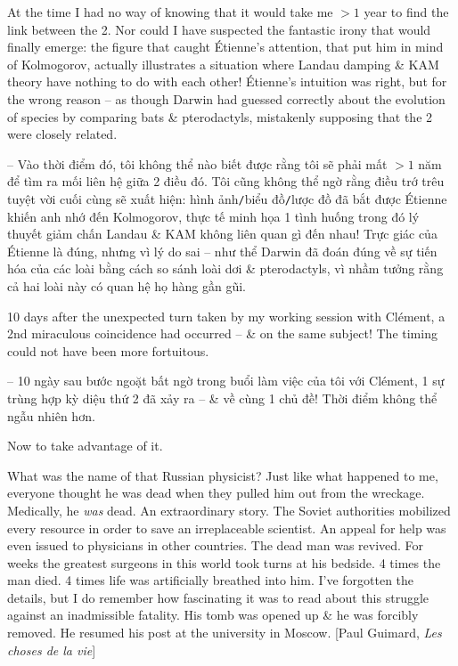 \documentclass{article}
\begin{document}
\begin{enumerate}
	At the time I had no way of knowing that it would take me $> 1$ year to find the link between the 2. Nor could I have suspected the fantastic irony that would finally emerge: the figure that caught {\sc\'Etienne}'s attention, that put him in mind of {\sc Kolmogorov}, actually illustrates a situation where {\sc Landau} damping \& KAM theory have nothing to do with each other! {\sc\'Etienne}'s intuition was right, but for the wrong reason -- as though {\sc Darwin} had guessed correctly about the evolution of species by comparing bats \& pterodactyls, mistakenly supposing that the 2 were closely related.

	-- Vào thời điểm đó, tôi không thể nào biết được rằng tôi sẽ phải mất $>1$ năm để tìm ra mối liên hệ giữa 2 điều đó. Tôi cũng không thể ngờ rằng điều trớ trêu tuyệt vời cuối cùng sẽ xuất hiện: hình ảnh{\tt/}biểu đồ{\tt/}lược đồ đã bắt được {\sc\'Etienne } khiến anh nhớ đến {\sc Kolmogorov}, thực tế minh họa 1 tình huống trong đó lý thuyết giảm chấn {\sc Landau} \& KAM không liên quan gì đến nhau! Trực giác của {\sc\'Etienne} là đúng, nhưng vì lý do sai -- như thể {\sc Darwin} đã đoán đúng về sự tiến hóa của các loài bằng cách so sánh loài dơi \& pterodactyls, vì nhầm tưởng rằng cả hai loài này có quan hệ họ hàng gần gũi.

	10 days after the unexpected turn taken by my working session with Cl\'ement, a 2nd miraculous coincidence had occurred -- \& on the same subject! The timing could not have been more fortuitous.

	-- 10 ngày sau bước ngoặt bất ngờ trong buổi làm việc của tôi với Cl\'ement, 1 sự trùng hợp kỳ diệu thứ 2 đã xảy ra -- \& về cùng 1 chủ đề! Thời điểm không thể ngẫu nhiên hơn.

	Now to take advantage of it.

	What was the name of that Russian physicist? Just like what happened to me, everyone thought he was dead when they pulled him out from the wreckage. Medically, he {\it was} dead. An extraordinary story. The Soviet authorities mobilized every resource in order to save an irreplaceable scientist. An appeal for help was even issued to physicians in other countries. The dead man was revived. For weeks the greatest surgeons in this world took turns at his bedside. 4 times the man died. 4 times life was artificially breathed into him. I've forgotten the details, but I do remember how fascinating it was to read about this struggle against an inadmissible fatality. His tomb was opened up \& he was forcibly removed. He resumed his post at the university in Moscow. [{\sc Paul Guimard}, {\it Les choses de la vie}]


\end{enumerate}
\end{document}
